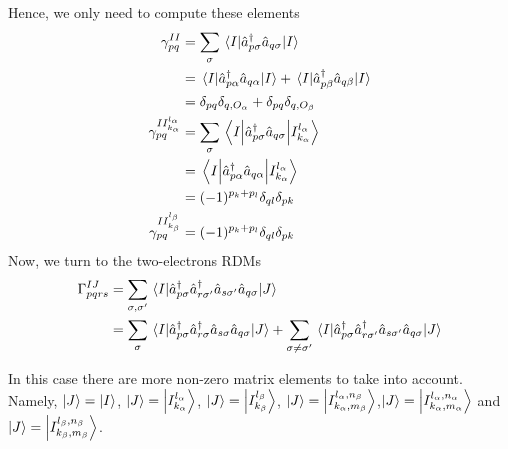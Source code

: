 \documentclass[11pt,a4paper]{article}
\newcommand{\oa}{O_{\alpha}}
\newcommand{\ob}{O_{\beta}}
\begin{document}
Hence, we only need to compute these elements
\begin{subequations}
  \label{eq:1RDM_nonzero}
  \begin{align}
    \gamma_{pq}^{II} &= \sum_\sigma\mel{I}{\hat{a}_{p\sigma}^\dagger \hat{a}_{q\sigma}}{I} \\
                     &= \mel{I}{\hat{a}_{p\alpha}^\dagger \hat{a}_{q\alpha}}{I} + \mel{I}{\hat{a}_{p\beta}^\dagger \hat{a}_{q\beta}}{I} \notag\\
                     &= \delta_{pq} \delta_{q,\oa} + \delta_{pq} \delta_{q,\ob} \notag \\
    \gamma_{pq}^{II_{k_\alpha}^{l_\alpha}} &= \sum_\sigma\mel{I}{\hat{a}_{p\sigma}^\dagger \hat{a}_{q\sigma}}{I_{k_\alpha}^{l_\alpha}} \\
                     &= \mel{I}{\hat{a}_{p\alpha}^\dagger \hat{a}_{q\alpha}}{I_{k_\alpha}^{l_\alpha}} \notag\\
                     &= (-1)^{p_k+p_l} \delta_{ql}\delta_{pk} \notag \\
    \gamma_{pq}^{II_{k_\beta}^{l_\beta}} &= (-1)^{p_k+p_l} \delta_{ql}\delta_{pk}
  \end{align} 
\end{subequations}
Now, we turn to the two-electrons RDMs
\begin{align}
  \label{eq:2RDM}
  \Gamma_{pqrs}^{IJ}&=\sum_{\sigma,\sigma'}\mel{I}{\hat{a}_{p\sigma}^\dagger\hat{a}_{r\sigma'}^\dagger\hat{a}_{s\sigma'}\hat{a}_{q\sigma}}{J} \\
  &= \sum_{\sigma}\mel{I}{\hat{a}_{p\sigma}^\dagger\hat{a}_{r\sigma}^\dagger\hat{a}_{s\sigma}\hat{a}_{q\sigma}}{J} + \sum_{\sigma \neq \sigma'}\mel{I}{\hat{a}_{p\sigma}^\dagger\hat{a}_{r\sigma'}^\dagger\hat{a}_{s\sigma'}\hat{a}_{q\sigma}}{J} \notag
\end{align}

In this case there are more non-zero matrix elements to take into account. Namely, $\ket{J}=\ket{I}$, $\ket{J}=\ket{I_{k_\alpha}^{l_\alpha}}$, $\ket{J}=\ket{I_{k_\beta}^{l_\beta}}$, $\ket{J}=\ket{I_{k_\alpha,m_\beta}^{l_\alpha,n_\beta}}$,$\ket{J}=\ket{I_{k_\alpha,m_\alpha}^{l_\alpha,n_\alpha}}$ and $\ket{J}=\ket{I_{k_\beta,m_\beta}^{l_\beta,n_\beta}}$.
\end{document}
